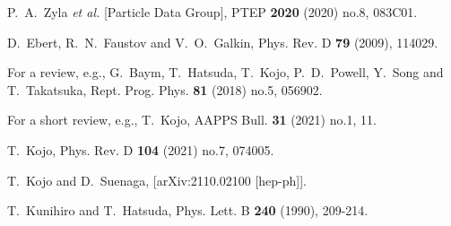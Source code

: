 \begin{thebibliography}{1000}
P.~A.~Zyla \textit{et al.} [Particle Data Group],
PTEP \textbf{2020} (2020) no.8, 083C01.


D.~Ebert, R.~N.~Faustov and V.~O.~Galkin,
Phys. Rev. D \textbf{79} (2009), 114029.



For a review, e.g., G.~Baym, T.~Hatsuda, T.~Kojo, P.~D.~Powell, Y.~Song and T.~Takatsuka,
Rept. Prog. Phys. \textbf{81} (2018) no.5, 056902.

For a short review, e.g., 
T.~Kojo,
AAPPS Bull. \textbf{31} (2021) no.1, 11.

T.~Kojo,
Phys. Rev. D \textbf{104} (2021) no.7, 074005.

T.~Kojo and D.~Suenaga,
[arXiv:2110.02100 [hep-ph]].

T.~Kunihiro and T.~Hatsuda,
Phys. Lett. B \textbf{240} (1990), 209-214.




\end{thebibliography}
